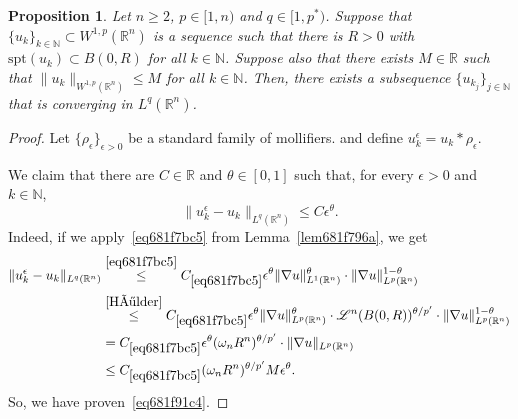 \documentclass[a4paper,9pt]{amsart}
\newcommand{\scr}[1]{\mathscr{#1}}
\newcommand{\N}{\mathbb{N}}	%
\newcommand{\R}{\mathbb{R}}	%
\newcommand{\spt}{\mathrm{spt}}
\newcommand{\grad}{\nabla}
\theoremstyle{plain}
\newtheorem{proposition}{Proposition}[section]
\theoremstyle{definition}
\theoremstyle{remark}
\begin{document}
\begin{proposition}\label{prop681f7c91}
	Let $n\ge2$, $p\in[1,n)$ and $q\in [1,p^*)$.
	Suppose that $\{u_k\}_{k\in\N}\subset W^{1,p}(\R^n)$ is a sequence 
	such that there is $R>0$ with $\spt(u_k)\subset B(0,R)$ for all $k\in\N$.
	Suppose also that there exists $M\in\R$ such that $\|u_k\|_{W^{1,p}(\R^n)}\le M$ for all $k\in\N$.
	Then, there exists a subsequence $\{u_{k_j}\}_{j\in\N}$ that is converging in $L^q(\R^n)$.
\end{proposition}
\begin{proof}
	
	Let $\{\rho_\epsilon\}_{\epsilon>0}$ be a standard family of mollifiers.
	and define $u_k^\epsilon = u_k*\rho_\epsilon$.

	We claim that there are $C\in\R$ and $\theta\in[0,1]$ such that, for every $\epsilon>0$ and $k\in\N$,
	\begin{equation}\label{eq681f91c4}
		\|u_k^\epsilon - u_k\|_{L^q(\R^n)} \le C\epsilon^\theta.
	\end{equation}
	Indeed, if we apply~\eqref{eq681f7bc5} from Lemma~\ref{lem681f796a}, we get
	\begin{align}
		\|u_k^\epsilon - u_k\|_{L^q(\R^n)}
		&\overset{\eqref{eq681f7bc5}}\le C_{\eqref{eq681f7bc5}} \epsilon^\theta 
			\|\grad u\|_{L^1(\R^n)}^\theta \cdot \|\grad u\|_{L^{p}(\R^n)}^{1-\theta} \\
		&\overset{\eqref{Hölder}}\le C_{\eqref{eq681f7bc5}} \epsilon^\theta 
			\|\grad u\|_{L^p(\R^n)}^\theta\cdot \scr L^n(B(0,R))^{\theta/p'} \cdot \|\grad u\|_{L^{p}(\R^n)}^{1-\theta} \\
		&= C_{\eqref{eq681f7bc5}} \epsilon^\theta \scr (\omega_nR^n)^{\theta/p'} \cdot \|\grad u\|_{L^{p}(\R^n)} \\
		&\le C_{\eqref{eq681f7bc5}}(\omega_nR^n)^{\theta/p'} M \epsilon^\theta .
	\end{align}
	So, we have proven~\eqref{eq681f91c4}.



\end{proof}
\end{document}
